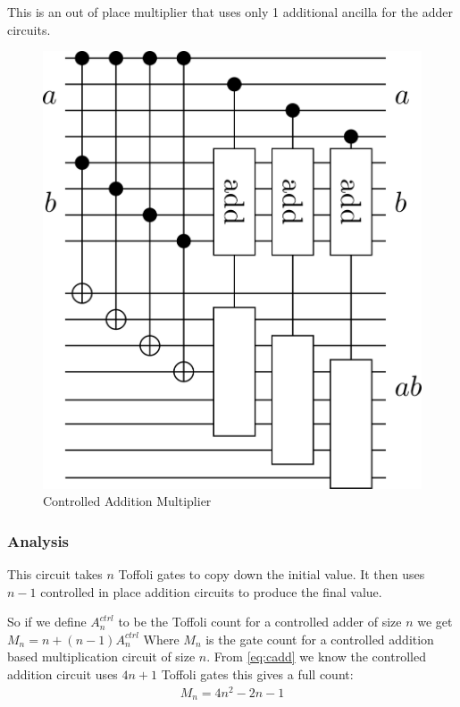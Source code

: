     This is an out of place multiplier that uses only 1 additional ancilla for the adder circuits.
    \begin{figure}[ht]
      \capstart
      \centering
      \includegraphics[scale=0.25]{images/multCtrlAdd} 
      \caption{Controlled Addition Multiplier}
      \label{fig:multAdd}
    \end{figure}
    \subsubsection{Analysis}
      This circuit takes $n$ Toffoli gates to copy down the initial value.  
      It then uses $n-1$ controlled in place addition circuits to produce the final value.
        
      So if we define $A^{ctrl}_n$ to be the Toffoli count for a controlled adder of size $n$ we get $M_n = n + (n-1)A^{ctrl}_n$
      Where $M_n$ is the gate count for a controlled addition based multiplication circuit of size $n$.
      From \eqref{eq:cadd} we know the controlled addition circuit uses $4n+1$ Toffoli gates this gives a full count:
      \begin{align} \label{eq:caddtoff}
        M_n = 4n^2 -2n -1
      \end{align} 
 
